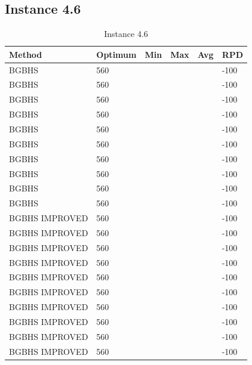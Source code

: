 \subsection{Instance 4.6}
\begin{table}[H]
\centering
\begin{tabular}{ | l | l | l | l | l | l | }
\hline
	Method & Optimum & Min & Max & Avg & RPD \\ \hline
	BGBHS & 560 &  &  &  & -100 \\ \hline
	BGBHS & 560 &  &  &  & -100 \\ \hline
	BGBHS & 560 &  &  &  & -100 \\ \hline
	BGBHS & 560 &  &  &  & -100 \\ \hline
	BGBHS & 560 &  &  &  & -100 \\ \hline
	BGBHS & 560 &  &  &  & -100 \\ \hline
	BGBHS & 560 &  &  &  & -100 \\ \hline
	BGBHS & 560 &  &  &  & -100 \\ \hline
	BGBHS & 560 &  &  &  & -100 \\ \hline
	BGBHS & 560 &  &  &  & -100 \\ \hline
	BGBHS IMPROVED & 560 &  &  &  & -100 \\ \hline
	BGBHS IMPROVED & 560 &  &  &  & -100 \\ \hline
	BGBHS IMPROVED & 560 &  &  &  & -100 \\ \hline
	BGBHS IMPROVED & 560 &  &  &  & -100 \\ \hline
	BGBHS IMPROVED & 560 &  &  &  & -100 \\ \hline
	BGBHS IMPROVED & 560 &  &  &  & -100 \\ \hline
	BGBHS IMPROVED & 560 &  &  &  & -100 \\ \hline
	BGBHS IMPROVED & 560 &  &  &  & -100 \\ \hline
	BGBHS IMPROVED & 560 &  &  &  & -100 \\ \hline
	BGBHS IMPROVED & 560 &  &  &  & -100 \\ \hline
\end{tabular}

\caption{Instance 4.6}
\label{tblscp46}
\end{table}
\newpage

